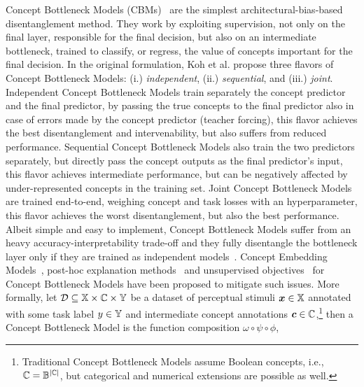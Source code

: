 Concept Bottleneck Models (CBMs)~\cite{koh2020concept} are the simplest architectural-bias-based disentanglement method. They work by exploiting supervision, not only on the final layer, responsible for the final decision, but also on an intermediate bottleneck, trained to classify, or regress, the value of concepts important for the final decision. 
In the original formulation, Koh et al. propose three flavors of Concept Bottleneck Models: (i.) \textit{independent}, (ii.) \textit{sequential}, and (iii.) \textit{joint}. 
Independent Concept Bottleneck Models train separately the concept predictor and the final predictor, by passing the true concepts to the final predictor also in case of errors made by the concept predictor (teacher forcing), this flavor achieves the best disentanglement and intervenability, but also suffers from reduced performance.
Sequential Concept Bottleneck Models also train the two predictors separately, but directly pass the concept outputs as the final predictor's input, this flavor achieves intermediate performance, but can be negatively affected by under-represented concepts in the training set.
Joint Concept Bottleneck Models are trained end-to-end, weighing concept and task losses with an hyperparameter, this flavor achieves the worst disentanglement, but also the best performance. 
%
Albeit simple and easy to implement, Concept Bottleneck Models suffer from an heavy accuracy-interpretability trade-off and they fully disentangle the bottleneck layer only if they are trained as independent models~\cite{margeloiu2021concept}.
Concept Embedding Models~\cite{espinosa2022concept}, post-hoc explanation methods~\cite{yuksekgonul2022post} and unsupervised objectives~\cite{sawada2022concept} for Concept Bottleneck Models have been proposed to mitigate such issues.
%
More formally, let ${\mathcal{D}} \subseteq {\mathbb{X}} \times {\mathbb{C}} \times {\mathbb{Y}}$ be a dataset of perceptual stimuli ${\bm{x}} \in {\mathbb{X}}$ annotated with some task label $y \in {\mathbb{Y}}$ and intermediate concept annotations ${\bm{c}} \in {\mathbb{C}}$,\footnote{Traditional Concept Bottleneck Models assume Boolean concepts, i.e., ${\mathbb{C}} = {\mathbb{B}}^{|{\mathbb{C}}|}$, but categorical and numerical extensions are possible as well.} then a Concept Bottleneck Model is the function composition $\omega \circ \psi \circ \phi$, 
%

